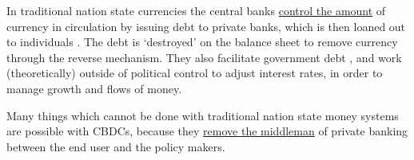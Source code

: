 In traditional nation state currencies the central banks \href{https://www.bankofengland.co.uk/markets/bank-of-england-market-operations-guide}{control the amount} of currency in circulation by issuing debt to private banks, which is then loaned out to individuals \cite{wang2021central}. The debt is `destroyed' on the balance sheet to remove currency through the reverse mechanism. They also facilitate government debt \cite{filardo2012central}, and work (theoretically) outside of political control to adjust interest rates, in order to manage growth and flows of money. \par
Many things which cannot be done with traditional nation state money systems are possible with CBDCs, because they \href{https://voxeu.org/article/benefits-central-bank-digital-currency}{remove the middleman} of private banking between the end user and the policy makers. 
